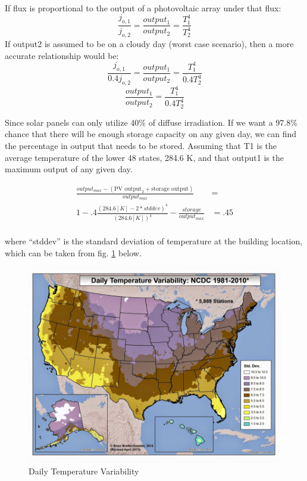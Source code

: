 If flux is proportional to the output of a photovoltaic array under that flux:
\begin{equation}
\frac{j_{o,1}}{j_{o,2}}=\frac{output_1}{output_2}=\frac{T_1^4}{T_2^4}
\end{equation}
If output2 is assumed to be on a cloudy day (worst case scenario), then a more
accurate relationship would be:
\begin{equation}
\frac{j_{o,1}}{0.4j_{o,2}}=\frac{output_1}{output_2}=\frac{T_1^4}{0.4T_2^4}
\end{equation}
\begin{equation}
\frac{output_1}{output_2}=\frac{T_1^4}{0.4T_2^4}
\end{equation}

Since solar panels can only utilize 40\% of diffuse irradiation. If we want a
97.8\% chance that there will be enough storage capacity on any given day, we
can find the percentage in output that needs to be stored. Assuming that T1 is
the average temperature of the lower 48 states, 284.6 K, and that output1 is
the maximum output of any given day.

\begin{equation}
\begin{aligned}
\frac{output_{max}-(\text{PV output}_2+\text{storage output})}{output_{max}} &=
\\
1-.4\frac{(284.6[K]-2*stddev)^4}{(284.6[K])^4}-\frac{storage}{output_{max}}
&=.45
\\
\end{aligned}
\end{equation}
 
where ``stddev'' is the standard deviation of
temperature at the building location, which can be taken from fig. \ref{p3}
below.

\begin{figure}
\begin{center}
\includegraphics[scale=1.0]{pics/PatrickFigure3.png}
\caption{Daily Temperature Variability}
\label{p3}
\end{center}
\end{figure}

